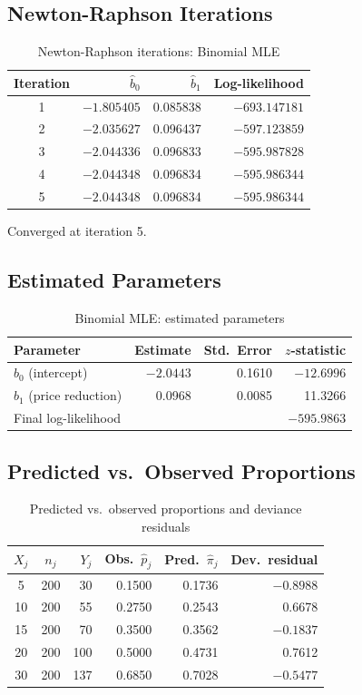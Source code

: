 \documentclass[12pt,a4paper]{article}
\begin{document}
\subsection{Newton-Raphson Iterations}

\begin{table}[H]
\centering
\caption{Newton-Raphson iterations: Binomial MLE}
\begin{tabular}{crrr}
\toprule
Iteration & $\hat{b}_0$ & $\hat{b}_1$ & Log-likelihood \\
\midrule
1 & $-1.805405$ & 0.085838 & $-693.147181$ \\
2 & $-2.035627$ & 0.096437 & $-597.123859$ \\
3 & $-2.044336$ & 0.096833 & $-595.987828$ \\
4 & $-2.044348$ & 0.096834 & $-595.986344$ \\
5 & $-2.044348$ & 0.096834 & $-595.986344$ \\
\bottomrule
\end{tabular}
\end{table}

Converged at iteration 5.

\subsection{Estimated Parameters}

\begin{table}[H]
\centering
\caption{Binomial MLE: estimated parameters}
\begin{tabular}{lrrr}
\toprule
Parameter & Estimate & Std.\ Error & $z$-statistic \\
\midrule
$b_0$ (intercept)       & $-2.0443$ & 0.1610 & $-12.6996$ \\
$b_1$ (price reduction) &  0.0968   & 0.0085 &  11.3266   \\
\midrule
\multicolumn{3}{l}{Final log-likelihood} & $-595.9863$ \\
\bottomrule
\end{tabular}
\end{table}

\subsection{Predicted vs.\ Observed Proportions}

\begin{table}[H]
\centering
\caption{Predicted vs.\ observed proportions and deviance residuals}
\begin{tabular}{ccrrrr}
\toprule
$X_j$ & $n_j$ & $Y_j$ & Obs.\ $\hat{p}_j$ & Pred.\ $\hat{\pi}_j$ & Dev.\ residual \\
\midrule
 5 & 200 &  30 & 0.1500 & 0.1736 & $-0.8988$ \\
10 & 200 &  55 & 0.2750 & 0.2543 &  0.6678  \\
15 & 200 &  70 & 0.3500 & 0.3562 & $-0.1837$ \\
20 & 200 & 100 & 0.5000 & 0.4731 &  0.7612  \\
30 & 200 & 137 & 0.6850 & 0.7028 & $-0.5477$ \\
\bottomrule
\end{tabular}
\end{table}
\end{document}
